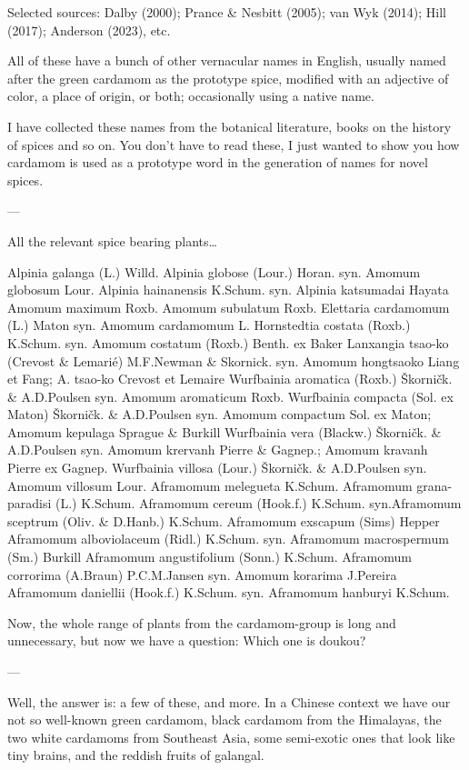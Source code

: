 \documentclass[12pt]{article}
\begin{document}
Selected sources: Dalby (2000); Prance \& Nesbitt (2005); van Wyk (2014); Hill (2017); Anderson (2023), etc.  



All of these have a bunch of other vernacular names in English, usually named after the green cardamom as the prototype spice, modified with an adjective of color, a place of origin, or both; occasionally using a native name.

I have collected these names from the botanical literature, books on the history of spices and so on. You don’t have to read these, I just wanted to show you how cardamom is used as a prototype word in the generation of names for novel spices.

---

All the relevant spice bearing plants…

Alpinia galanga (L.) Willd. 
Alpinia globose (Lour.) Horan. syn. Amomum globosum Lour.
Alpinia hainanensis K.Schum. syn. Alpinia katsumadai Hayata
Amomum maximum Roxb.	
Amomum subulatum Roxb.	
Elettaria cardamomum (L.) Maton syn. Amomum cardamomum L.
Hornstedtia costata (Roxb.) K.Schum. syn. Amomum costatum (Roxb.) Benth. ex Baker
Lanxangia tsao-ko (Crevost \& Lemarié) M.F.Newman \& Skornick. syn. Amomum hongtsaoko Liang et Fang; A. tsao-ko Crevost et Lemaire
Wurfbainia aromatica (Roxb.) Škorničk. \& A.D.Poulsen syn. Amomum aromaticum Roxb.
Wurfbainia compacta (Sol. ex Maton) Škorničk. \& A.D.Poulsen syn. Amomum compactum Sol. ex Maton; Amomum kepulaga Sprague \& Burkill
Wurfbainia vera (Blackw.) Škorničk. \& A.D.Poulsen syn. Amomum krervanh Pierre \& Gagnep.; Amomum kravanh Pierre ex Gagnep.
Wurfbainia villosa (Lour.) Škorničk. \& A.D.Poulsen syn. Amomum villosum Lour.
Aframomum melegueta K.Schum.	Aframomum grana-paradisi (L.) K.Schum. 
Aframomum cereum (Hook.f.) K.Schum. syn.Aframomum sceptrum (Oliv. \& D.Hanb.) K.Schum.
Aframomum exscapum (Sims) Hepper	
Aframomum alboviolaceum (Ridl.) K.Schum. syn. Aframomum macrospermum (Sm.) Burkill
Aframomum angustifolium (Sonn.) K.Schum.	
Aframomum corrorima (A.Braun) P.C.M.Jansen	 syn. Amomum korarima J.Pereira
Aframomum daniellii	(Hook.f.) K.Schum. syn. Aframomum hanburyi K.Schum.

Now, the whole range of plants from the cardamom-group is long and unnecessary, but now we have a question: Which one is doukou?

---

Well, the answer is: a few of these, and more. In a Chinese context we have our not so well-known green cardamom, black cardamom from the Himalayas, the two white cardamoms from Southeast Asia, some semi-exotic ones that look like tiny brains, and the reddish fruits of galangal.
\end{document}
